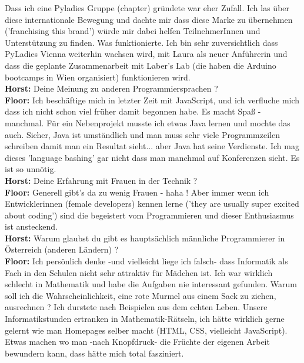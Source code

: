 Dass ich eine Pyladies Gruppe (chapter) gründete war eher Zufall. Ich las über diese internationale Bewegung und dachte mir dass diese Marke zu übernehmen ('franchising this brand') würde mir dabei helfen TeilnehmerInnen und Unterstützung zu finden. Was funktionierte.
Ich bin sehr zuversichtlich dass PyLadies Vienna weiterhin wachsen wird, mit Laura als neuer Anführerin und dass die geplante Zusammenarbeit mit Laber's Lab (die haben die Arduino bootcamps in Wien organisiert) funktionieren wird. \\
\textbf{Horst:} Deine Meinung zu anderen Programmiersprachen ? \\
\textbf{Floor:} Ich beschäftige mich in letzter Zeit mit JavaScript, und ich verfluche mich dass ich nicht schon viel früher damit begonnen habe. Es macht Spaß - manchmal. Für ein Nebenprojekt musste ich etwas Java lernen und mochte das auch. Sicher, Java ist umständlich und man muss sehr viele Programmzeilen schreiben damit man ein Resultat sieht... aber Java hat seine Verdienste. Ich mag dieses 'language bashing' gar nicht dass man manchmal auf Konferenzen sieht. Es ist so unnötig. \\
\textbf{Horst:} Deine Erfahrung mit Frauen in der Technik ? \\
\textbf{Floor:} Generell gibt's da zu wenig Frauen - haha ! Aber immer wenn ich Entwicklerinnen (female developers) kennen lerne ('they are usually super excited about coding') sind die begeistert vom Programmieren und dieser Enthusiasmus ist ansteckend. \\
\textbf{Horst:} Warum glaubst du gibt es hauptsächlich männliche Programmierer in Österreich (anderen Ländern) ? \\
\textbf{Floor:} Ich persönlich denke -und vielleicht liege ich falsch- dass Informatik als Fach in den Schulen nicht sehr attraktiv für Mädchen ist. Ich war wirklich schlecht in Mathematik und habe die Aufgaben nie interessant gefunden. Warum soll ich die Wahrscheinlichkeit, eine rote Murmel aus einem Sack zu ziehen, ausrechnen ? Ich durstete nach Beispielen aus dem echten Leben. Unsere Informatikstunden ertranken in Mathematik-Rätseln, ich hätte wirklich gerne gelernt wie man Homepages selber macht (HTML, CSS, vielleicht JavaScript). Etwas machen wo man -nach Knopfdruck- die Früchte der eigenen Arbeit bewundern kann, dass hätte mich total fasziniert. 

